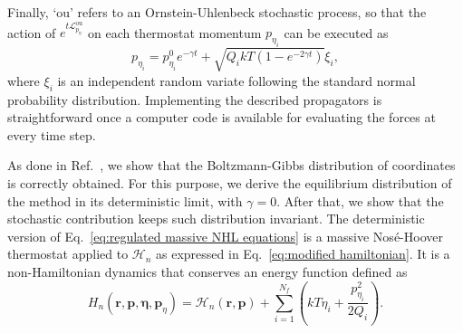 \documentclass[
aip,
jcp,
reprint,
]{revtex4-1}
\newcommand{\vt}[1]{\boldsymbol{\mathbf{#1}}}          %
\newcommand{\Liu}{\mathcal{L}}
\newcommand{\nn}{n}
\begin{document}
Finally, `ou' refers to an Ornstein-Uhlenbeck stochastic process, so that the action of $e^{t \Liu^\mathrm{ou}_{p_\eta}}$ on each thermostat momentum $p_{\eta_i}$ can be executed as
\begin{equation}
p_{\eta_i} = p_{\eta_i}^0 e^{-\gamma t} + \sqrt{Q_i kT (1 - e^{-2\gamma t})} \xi_i,
\end{equation}
where $\xi_i$ is an independent random variate following the standard normal probability distribution.
Implementing the described propagators is straightforward once a computer code is available for evaluating the forces at every time step.

As done in Ref.~, we show that the Boltzmann-Gibbs distribution of coordinates is correctly obtained.
For this purpose, we derive the equilibrium distribution of the method in its deterministic limit, with $\gamma=0$.
After that, we show that the stochastic contribution keeps such distribution invariant.
The deterministic version of Eq.~\eqref{eq:regulated massive NHL equations} is a massive Nos\'e-Hoover \cite{Nose_1984, Hoover_1985} thermostat applied to $\mathcal{H}_\nn$ as expressed in Eq.~\eqref{eq:modified hamiltonian}.
It is a non-Hamiltonian dynamics that conserves an energy function defined as
\begin{equation}
\label{eq:extended energy}
H_\nn(\vt r, \vt p, \vt \eta, \vt p_\eta) = {\mathcal H}_\nn(\vt r, \vt p) + \sum_{i=1}^{N_f} \left(k T \eta_i + \frac{p_{\eta_i}^2}{2 Q_i} \right).
\end{equation}
\end{document}
